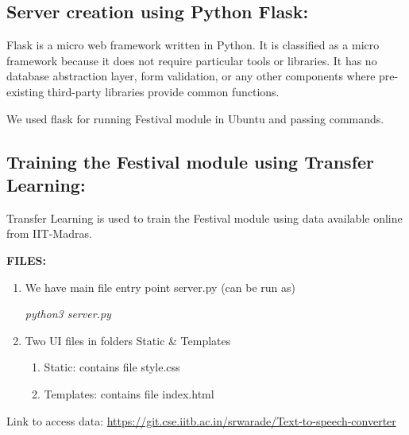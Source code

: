 \documentclass{article}
\begin{document}
\subsection{Server creation using Python Flask:}

\large \cite{stackoverflow}Flask is a micro web framework written in Python. It is classified as a micro framework because it does not require particular tools or libraries. It has no database abstraction layer, form validation, or any other components where pre-existing third-party libraries provide common functions.\par

We used flask for running Festival module in Ubuntu and passing commands.

\bigskip

\subsection{Training the Festival module using Transfer Learning:}
\large Transfer Learning is used to train the Festival module using data available online from IIT-Madras. 

\bigskip
\newpage
\textbf{FILES:}
\begin{enumerate}
    \item \Large We have main file entry point server.py (can be run as)
    
    \begin{displayquote}
        \textit{python3 server.py}
    \end{displayquote}
    
    \item \Large Two UI files in folders Static & Templates 
        \begin{enumerate}
            \item Static: 
                contains file style.css
            \item Templates: 
                contains file index.html
        \end{enumerate}
    
\end{enumerate}

\large Link to access data: \url{https://git.cse.iitb.ac.in/srwarade/Text-to-speech-converter}


\newpage
\end{document}
